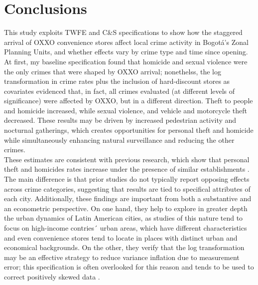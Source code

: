 \documentclass[12pt]{article}
\begin{document}
\section{Conclusions}
\label{sec:Conclusions}

This study exploits TWFE and C\&S specifications to show how the staggered arrival of OXXO convenience stores affect local crime activity in Bogotá’s Zonal Planning Units, and whether effects vary by crime type and time since opening. At first, my baseline specification found that homicide and sexual violence were the only crimes that were shaped by OXXO arrival; nonethelss, the log transformation in crime rates plus the inclusion of hard-discount stores as covariates evidenced that, in fact, all crimes evaluated (at different levels of significance) were affected by OXXO, but in a different direction. Theft to people and homicide increased, while sexual violence, and vehicle and motorcycle theft decreased. These results may be driven by increased pedestrian activity and nocturnal gatherings, which creates opportunities for personal theft and homicide while simultaneously enhancing natural surveillance and reducing the other crimes.\\

These estimates are consistent with previous research, which show that personal theft and homicides rates increase under the presence of similar establishments \parencite{Bowen2022, askey2018fast, Dugato2026, Brantingham1995}. The main difference is that prior studies do not typically report opposing effects across crime categories, suggesting that results are tied to specifical attributes of each city. Additionally, these findings are important from both a substantive and an econometric perspective. On one hand, they help to explore in greater depth the urban dynamics of Latin American cities, as studies of this nature tend to focus on high-income contries´ urban areas, which have different characteristics and even convenience stores tend to locate in places with distinct urban and economical backgrounds. On the other, they verify that the log transformation may be an effective strategy to reduce variance inflation due to measurement error; this specification is often overlooked for this reason and tends to be used to correct positively skewed data \parencite{pinasanchez2022impact}.\\
\end{document}
